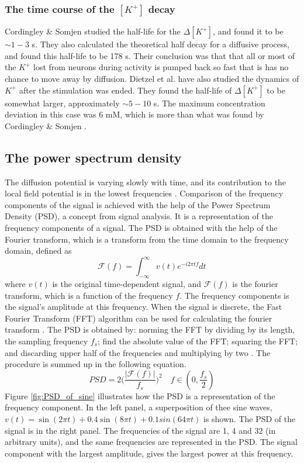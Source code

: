 \documentclass{article}
\begin{document}
\subsubsection{The time course of the $[K^+]$ decay }\label{time course}

Cordingley \& Somjen \cite{CordingleySomjen} studied the half-life for the $\Delta[K^+]$, and found it to be $\sim 1-3$ s. They also calculated the theoretical half decay for a diffusive process, and found this half-life to be 178 s. Their conclusion was that that all or most
of the $K^+$ lost from neurons during activity is pumped back so fast that is has no
chance to move away by diffusion. Dietzel et al.\cite{Dietzel1982} have also studied the dynamics of $K^+$ after the stimulation was ended. They found the half-life of $\Delta [K^+]$ to be somewhat larger, approximately $\sim 5-10$ s. The maximum concentration deviation in this case was 6 mM, which is more than what was found by Cordingley \& Somjen \cite{CordingleySomjen}.

 
\subsection{The power spectrum density}\label{PSD}
The diffusion potential is varying slowly with time, and its contribution to the local field potential is in the lowest frequencies \cite{Halnes2016}. Comparison of the frequency components of the signal is achieved with the help of the Power Spectrum Density (PSD), a concept from signal analysis. It is a representation of the frequency components of a signal. The PSD is obtained with the help of the Fourier transform, which is a transform from the time domain to the frequency domain, defined as
\begin{equation}
\mathcal{F}(f)=\int_{-\infty}^{\infty} v(t)e^{-i2\pi tf} dt
\end{equation}
where $v(t)$ is the original time-dependent signal, and $\mathcal{F}(f)$ is the fourier transform, which is a function of the frequency $f$. The frequency components is the signal's amplitude at this frequency. When the signal is discrete, the Fast Fourier Transform (FFT) algorithm can be used for calculating the fourier transform \cite{wikipediaFFT}. The PSD is obtained by: norming the FFT by dividing by its length, the sampling frequency $f_s$; find the absolute value of the FFT; squaring the FFT; and discarding upper half of the frequencies and multiplying by two \cite{PSDtutorial}. The procedure is summed up in the following equation.
\begin{equation}
PSD = 2\bigg(\frac{|\mathcal{F}(f)|}{f_s}\bigg)^2 \quad f \in (0,\frac{f_s}{2})
\end{equation}
Figure \ref{fig:PSD_of_sine} illustrates how the PSD is a representation of the frequency component. In the left panel, a superposition of thee sine waves, $v(t) = \sin (2\pi t) + 0.4 \sin (8\pi t)+ 0.1 sin (64\pi t)$ is shown. The PSD of the signal is in the right panel. The frequencies of the signal are 1, 4 and 32 (in arbitrary units), and the same frequencies are represented in the PSD. The signal component with the largest amplitude, gives the largest power at this frequency.
\end{document}
